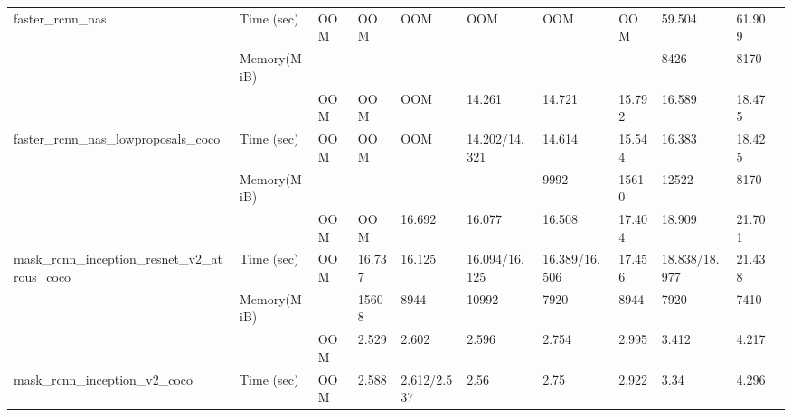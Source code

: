 \documentclass[conference]{IEEEtran}
\begin{document}
\begin{table}[]
{\begin{tabular}{lllllllllll}
faster\_rcnn\_nas                                               & Time (sec)    & OOM                 & OOM                & OOM               & OOM               & OOM              & OOM    & 59.504            & 61.909      &          \\
                                                                & Memory(MiB)   &                     &                    &                   &                   &                  &        & 8426              & 8170        &          \\
                                                                &               & OOM                 & OOM                & OOM               & 14.261            & 14.721           & 15.792 & 16.589            & 18.475      &          \\
faster\_rcnn\_nas\_lowproposals\_coco                           & Time (sec)    & OOM                 & OOM                & OOM               & 14.202/14.321     & 14.614           & 15.544 & 16.383            & 18.425      &          \\
                                                                & Memory(MiB)   &                     &                    &                   &                   & 9992             & 15610  & 12522             & 8170        &          \\
                                                                &               & OOM                 & OOM                & 16.692            & 16.077            & 16.508           & 17.404 & 18.909            & 21.701      &          \\
mask\_rcnn\_inception\_resnet\_v2\_atrous\_coco                 & Time (sec)    & OOM                 & 16.737             & 16.125            & 16.094/16.125     & 16.389/16.506    & 17.456 & 18.838/18.977     & 21.438      &          \\
                                                                & Memory(MiB)   &                     & 15608              & 8944              & 10992             & 7920             & 8944   & 7920              & 7410        &          \\
                                                                &               & OOM                 & 2.529              & 2.602             & 2.596             & 2.754            & 2.995  & 3.412             & 4.217       &          \\
mask\_rcnn\_inception\_v2\_coco                                 & Time (sec)    & OOM                 & 2.588              & 2.612/2.537       & 2.56              & 2.75             & 2.922  & 3.34              & 4.296       &          \\

\end{tabular}}
\end{table}
\end{document}
